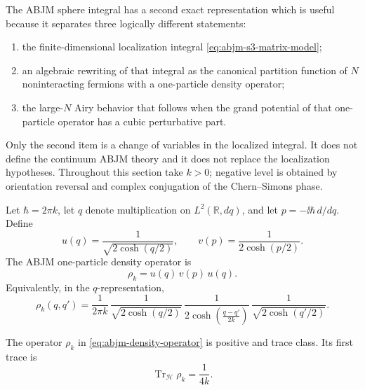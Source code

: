 The ABJM sphere integral has a second exact representation which is useful
because it separates three logically different statements:
\begin{enumerate}
\item the finite-dimensional localization integral
\eqref{eq:abjm-s3-matrix-model};
\item an algebraic rewriting of that integral as the canonical partition
function of \(N\) noninteracting fermions with a one-particle density
operator;
\item the large-\(N\) Airy behavior that follows when the grand potential of
that one-particle operator has a cubic perturbative part.
\end{enumerate}
Only the second item is a change of variables in the localized integral.  It
does not define the continuum ABJM theory and it does not replace the
localization hypotheses.  Throughout this section take \(k>0\); negative
level is obtained by orientation reversal and complex conjugation of the
Chern--Simons phase.

Let \(\hbar=2\pi k\), let \(q\) denote multiplication on
\(L^2(\mathbb R,dq)\), and let \(p=-\ii\hbar\,d/dq\).  Define
\[
  u(q)=\frac1{\sqrt{2\cosh(q/2)}},
  \qquad
  v(p)=\frac1{2\cosh(p/2)}.
\]
The ABJM one-particle density operator is
\begin{equation}
  \rho_k
  =
  u(q)\,v(p)\,u(q).
  \label{eq:abjm-density-operator}
\end{equation}
Equivalently, in the \(q\)-representation,
\begin{equation}
  \rho_k(q,q')
  =
  \frac1{2\pi k}\,
  \frac1{\sqrt{2\cosh(q/2)}}\,
  \frac1{2\cosh\!\left(\frac{q-q'}{2k}\right)}\,
  \frac1{\sqrt{2\cosh(q'/2)}} .
  \label{eq:abjm-fermi-gas-kernel}
\end{equation}

\begin{lemma}
\label{lem:abjm-kernel-trace-class}
The operator \(\rho_k\) in \eqref{eq:abjm-density-operator} is positive and
trace class.  Its first trace is
\begin{equation}
  \operatorname{Tr}_{\mathcal H}\rho_k=\frac1{4k}.
  \label{eq:abjm-rho-first-trace}
\end{equation}
\end{lemma}

